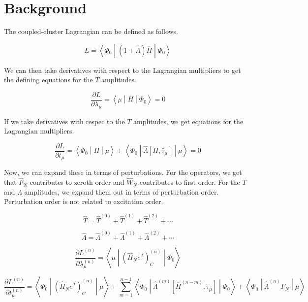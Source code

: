\documentclass{article}
\begin{document}
\section{Background}

The coupled-cluster Lagrangian can be defined as follows.

\begin{equation}
  L = \left<\Phi_0\middle|\left(1 + \hat{\Lambda}\right)\overline{H}\middle|\Phi_0\right>
\end{equation}

We can then take derivatives with respect to the Lagrangian multipliers to get the defining equations for the $T$ amplitudes.

\begin{equation}
  \frac{\partial L}{\partial \lambda_\mu} = \left<\mu\middle|\overline{H}\middle|\Phi_0\right> = 0
\end{equation}

If we take derivatives with respec to the $T$ amplitudes, we get equations for the Lagrangian multipliers.

\begin{equation}
  \frac{\partial L}{\partial t_\mu} = \left<\Phi_0\middle|\overline{H}\middle|\mu\right> + \left<\Phi_0\middle|\hat{\Lambda}\left[\overline{H}, \hat{\tau}_\mu\right]\middle|\mu\right> = 0
\end{equation}

Now, we can expand these in terms of perturbations. For the operators, we get that $\hat{F}_N$ contributes to zeroth order and $\hat{W}_N$ contributes to first order. For the $T$ and $\Lambda$ amplitudes, we expand them out in terms of perturbation order. Perturbation order is not related to excitation order.

\begin{equation}
  \hat{T} = \hat{T}^{(0)} + \hat{T}^{(1)} + \hat{T}^{(2)} + \cdots
\end{equation}

\begin{equation}
  \hat{\Lambda} = \hat{\Lambda}^{(0)} + \hat{\Lambda}^{(1)} + \hat{\Lambda}^{(2)} + \cdots
\end{equation}

\begin{equation}
  \frac{\partial L^{(n)}}{\partial \lambda_\mu^{(n)}} = \left<\mu\middle|\left(\hat{H}_Ne^{\hat{T}}\right)^{(n)}_C\middle|\Phi_0\right>
\end{equation}

\begin{equation}
  \frac{\partial L^{(n)}}{\partial t_\mu^{(n)}} = \left<\Phi_0\middle|\left(\hat{H}_Ne^{\hat{T}}\right)^{(n)}_C\middle|\mu\right> + \sum_{m = 1}^{n - 1}\left<\Phi_0\middle|\hat{\Lambda}^{(m)}\left[\overline{H}^{(n - m)}, \hat{\tau}_\mu\right]\middle|\Phi_0\right> + \left<\Phi_0\middle|\hat{\Lambda}^{(n)}\hat{F}_N\middle|\mu\right>
\end{equation}
\end{document}
